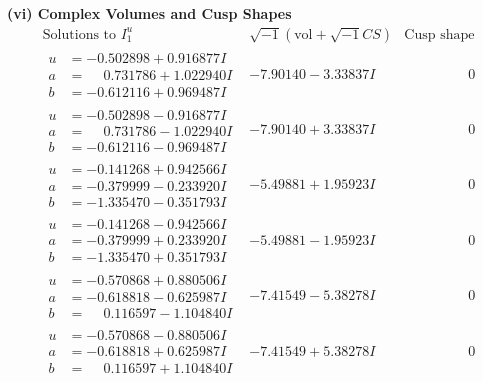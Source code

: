 \documentclass[1p]{elsarticle_modified}
\theoremstyle{definition}
\newcommand{\I}{\sqrt{-1}}
\begin{document}
\newpage\flushleft \textbf{(vi) Complex Volumes and Cusp Shapes}
$$\begin{array}{c|c|c}  
\text{Solutions to }I^u_{1}& \I (\text{vol} + \sqrt{-1}CS) & \text{Cusp shape}\\
 \hline 
\begin{aligned}
u &= -0.502898 + 0.916877 I \\
a &= \phantom{-}0.731786 + 1.022940 I \\
b &= -0.612116 + 0.969487 I\end{aligned}
 & -7.90140 - 3.33837 I & \phantom{-0.000000 } 0 \\ \hline\begin{aligned}
u &= -0.502898 - 0.916877 I \\
a &= \phantom{-}0.731786 - 1.022940 I \\
b &= -0.612116 - 0.969487 I\end{aligned}
 & -7.90140 + 3.33837 I & \phantom{-0.000000 } 0 \\ \hline\begin{aligned}
u &= -0.141268 + 0.942566 I \\
a &= -0.379999 - 0.233920 I \\
b &= -1.335470 - 0.351793 I\end{aligned}
 & -5.49881 + 1.95923 I & \phantom{-0.000000 } 0 \\ \hline\begin{aligned}
u &= -0.141268 - 0.942566 I \\
a &= -0.379999 + 0.233920 I \\
b &= -1.335470 + 0.351793 I\end{aligned}
 & -5.49881 - 1.95923 I & \phantom{-0.000000 } 0 \\ \hline\begin{aligned}
u &= -0.570868 + 0.880506 I \\
a &= -0.618818 - 0.625987 I \\
b &= \phantom{-}0.116597 - 1.104840 I\end{aligned}
 & -7.41549 - 5.38278 I & \phantom{-0.000000 } 0 \\ \hline\begin{aligned}
u &= -0.570868 - 0.880506 I \\
a &= -0.618818 + 0.625987 I \\
b &= \phantom{-}0.116597 + 1.104840 I\end{aligned}
 & -7.41549 + 5.38278 I & \phantom{-0.000000 } 0 \\ \hline\begin{aligned}

\end{aligned}
\end{array}$$
\end{document}
